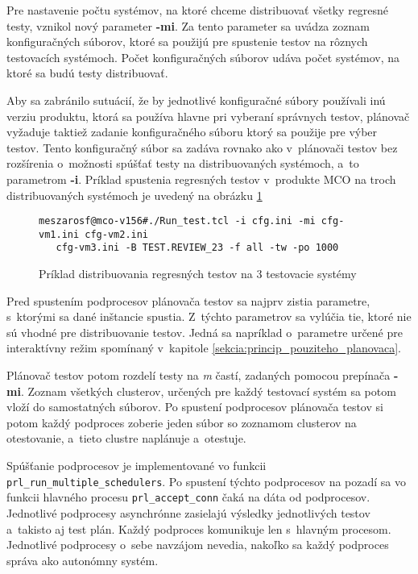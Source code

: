 Pre nastavenie počtu systémov, na ktoré chceme distribuovať všetky regresné testy, vznikol nový parameter \textbf{-mi}.
Za tento parameter sa uvádza zoznam konfiguračných súborov, ktoré sa použijú pre spustenie testov na rôznych
testovacích systémoch. Počet konfiguračných súborov udáva počet systémov, na ktoré sa budú testy distribuovať.

Aby sa zabránilo sutuácií, že by jednotlivé konfiguračné súbory používali inú verziu produktu, ktorá sa
používa hlavne pri vyberaní správnych testov, plánovač vyžaduje taktiež zadanie konfiguračného súboru ktorý
sa použije pre výber testov. Tento konfiguračný súbor sa zadáva rovnako ako v~plánovači testov bez rozšírenia
o~možnosti spúšťať testy na distribuovaných systémoch, a~to parametrom \textbf{-i}.
Príklad spustenia regresných testov v~produkte MCO na troch distribuovaných systémoch je uvedený na obrázku 
\ref{obrazok:priklad_spustania_testov_paralelne}

\begin{figure}[h]
\begin{lstlisting}
meszarosf@mco-v156#./Run_test.tcl -i cfg.ini -mi cfg-vm1.ini cfg-vm2.ini 
   cfg-vm3.ini -B TEST.REVIEW_23 -f all -tw -po 1000
\end{lstlisting}
\caption{Príklad distribuovania regresných testov na 3 testovacie systémy}
\label{obrazok:priklad_spustania_testov_paralelne}
\end{figure}

Pred spustením podprocesov plánovača testov sa najprv zistia parametre, s~ktorými sa dané 
inštancie spustia. Z~týchto parametrov sa vylúčia tie, ktoré nie sú vhodné pre
distribuovanie testov. Jedná sa napríklad o~parametre určené pre interaktívny režim spomínaný v~kapitole 
\ref{sekcia:princip_pouziteho_planovaca}.

Plánovač testov potom rozdelí testy na \textit{m} častí, zadaných pomocou prepínača \textbf{-mi}.
Zoznam všetkých clusterov, určených pre každý testovací systém sa potom vloží do samostatných súborov.
Po spustení podprocesov plánovača testov si potom každý podproces zoberie jeden súbor so zoznamom 
clusterov na otestovanie, a~tieto clustre naplánuje a~otestuje.

Spúšťanie podprocesov je implementované vo funkcii \texttt{prl\_run\_multiple\_schedulers}.
Po spustení týchto podprocesov na pozadí sa vo funkcii hlavného procesu \texttt{prl\_accept\_conn} čaká na dáta od podprocesov.
Jednotlivé podprocesy asynchrónne zasielajú výsledky jednotlivých testov a~takisto aj test plán.
Každý podproces komunikuje len s~hlavným procesom. Jednotlivé podprocesy o~sebe navzájom nevedia,
nakoľko sa každý podproces správa ako autonómny systém. 

